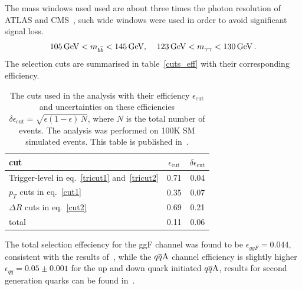 The mass windows used used are about three times the photon resolution of ATLAS and CMS~\cite{ATL-PHYS-PUB-2013-009,CMS:2013aoa}, such wide windows were used in order to avoid significant signal loss.
\begin{equation}
	105\,\GeV < m_{b \bar b} < 145 \, \GeV, \; \; \; \;123\, \GeV < m_{\gamma \gamma} < 130 \, \GeV\,.
	\label{cut3}
\end{equation}
The selection cuts are summarised in table~\autoref{cuts_eff} with their corresponding efficiency. 
\begin{table}[!t]
	\centering
	\begin{tabular}{l cc }
			\toprule
			cut  & $\epsilon_{\mathrm{cut}}$  &  $ \delta \epsilon_{\mathrm{cut}}$ \\
			\midrule
			Trigger-level in eq.~\eqref{tricut1} and~\eqref{tricut2} &0.71 & 0.04 \\
			$p_T$ cuts in eq.~\eqref{cut1} & 0.35 & 0.07\\
			$\Delta R$ cuts  in eq.~\eqref{cut2} & 0.69 & 0.21 \\
			\hline
			total    & 0.11 & 0.06 \\
			\bottomrule
		\end{tabular}
	\caption{The cuts used in the analysis with their efficiency $\epsilon_{\mathrm{cut}}$ and uncertainties on these efficiencies $ \delta \epsilon_{\mathrm{cut}} = \sqrt{\epsilon(1-\epsilon)\,N}$, where $N$ is the total number of events. The analysis was performed on 100K SM simulated events. This table is published in~\cite{Alasfar:2019pmn}.}
	\label{cuts_eff}
\end{table}
%
The total selection effeciency for the ggF channel was found to be $\epsilon_{ggF} = 0.044$, consistent with the results of~\cite{Azatov:2015oxa}, while the $q\overline q \rm A$ channel efficiency is slightly higher $\epsilon_{qq} = 0.05 \pm 0.001$ for the up and down quark initiated $ q\overline q \rm A$, results for second generation quarks can be found in~\cite{Alasfar:2019pmn}.
